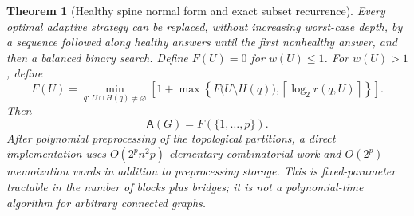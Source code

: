 \documentclass[11pt,letterpaper]{article}
\newtheorem{theorem}{Theorem}
\newcommand{\ceil}[1]{\left\lceil #1\right\rceil}
\newcommand{\A}{\mathsf A}
\begin{document}
\begin{theorem}[Healthy spine normal form and exact subset recurrence]\label{thm:spine}
Every optimal adaptive strategy can be replaced, without increasing worst-case depth, by a sequence followed along healthy answers until the first nonhealthy answer, and then a balanced binary search. Define $F(U)=0$ for $w(U)\le1$. For $w(U)>1$, define
\[
 F(U)=\min_{q:\,U\cap H(q)\ne\varnothing}
 \left[1+\max\left\{F\bigl(U\setminus H(q)\bigr),
                \ceil{\log_2 r(q,U)}\right\}\right].
\]
Then
\[
 \A(G)=F(\{1,\ldots,p\}).
\]
After polynomial preprocessing of the topological partitions, a direct implementation uses $O(2^p n^2p)$ elementary combinatorial work and $O(2^p)$ memoization words in addition to preprocessing storage. This is fixed-parameter tractable in the number of blocks plus bridges; it is not a polynomial-time algorithm for arbitrary connected graphs.
\end{theorem}
\end{document}
